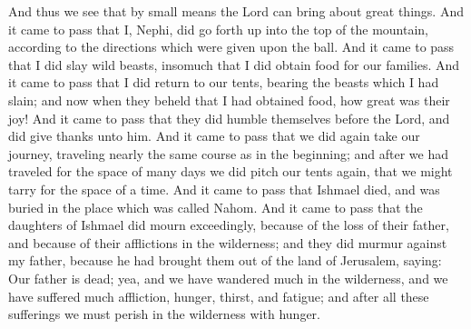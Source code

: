 And thus we see that by small means the Lord can bring about great things.
\bverse \iffalse And it came to pass that I, Nephi, did go forth up into the top of the mountain, according to the directions which were given upon the ball. \fi
And it came to pass that I, Nephi, did go forth up into the top of the mountain, according to the directions which were given upon the ball.
\bverse \iffalse And it came to pass that I did slay wild beasts, insomuch that I did obtain food for our families. \fi
And it came to pass that I did slay wild beasts, insomuch that I did obtain food for our families.
\bverse \iffalse And it came to pass that I did return to our tents, bearing the beasts which I had slain; and now when they beheld that I had obtained food, how great was their joy! And it came to pass that they did humble themselves before the Lord, and did give thanks unto him. \fi
And it came to pass that I did return to our tents, bearing the beasts which I had slain; and now when they beheld that I had obtained food, how great was their joy! And it came to pass that they did humble themselves before the Lord, and did give thanks unto him.
\bverse \iffalse And it came to pass that we did again take our journey, traveling nearly the same course as in the beginning; and after we had traveled for the space of many days we did pitch our tents again, that we might tarry for the space of a time. \fi
And it came to pass that we did again take our journey, traveling nearly the same course as in the beginning; and after we had traveled for the space of many days we did pitch our tents again, that we might tarry for the space of a time.
\bverse \iffalse And it came to pass that Ishmael died, and was buried in the place which was called Nahom. \fi
And it came to pass that Ishmael died, and was buried in the place which was called Nahom.
\bverse \iffalse And it came to pass that the daughters of Ishmael did mourn exceedingly, because of the loss of their father, and because of their afflictions in the wilderness; and they did murmur against my father, because he had brought them out of the land of Jerusalem, saying: Our father is dead; yea, and we have wandered much in the wilderness, and we have suffered much affliction, hunger, thirst, and fatigue; and after all these sufferings we must perish in the wilderness with hunger. \fi
And it came to pass that the daughters of Ishmael did mourn exceedingly, because of the loss of their father, and because of their afflictions in the wilderness; and they did murmur against my father, because he had brought them out of the land of Jerusalem, saying: Our father is dead; yea, and we have wandered much in the wilderness, and we have suffered much affliction, hunger, thirst, and fatigue; and after all these sufferings we must perish in the wilderness with hunger.
